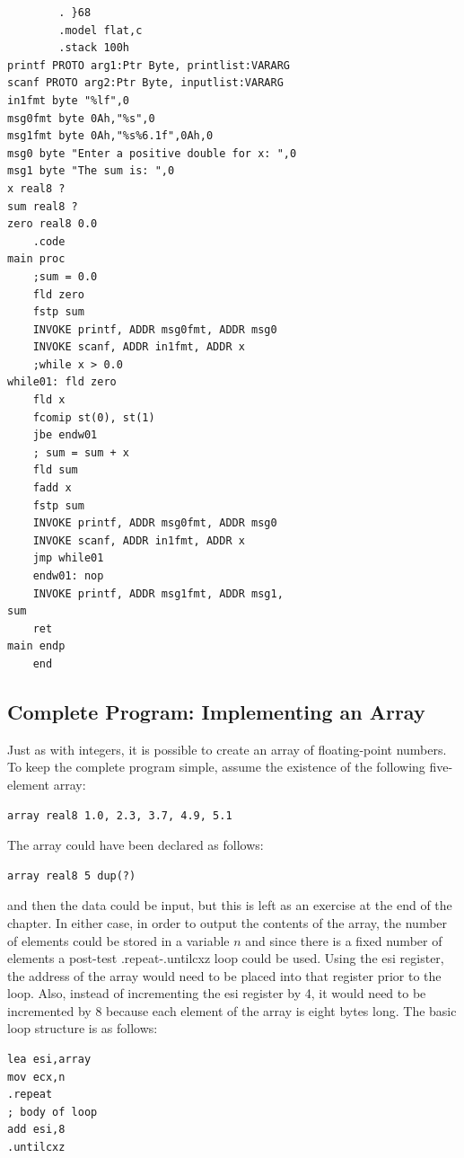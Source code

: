 \documentclass[10pt]{book}
\begin{document}
\begin{verbatim}
        . }68
        .model flat,c
        .stack 100h
printf PROTO arg1:Ptr Byte, printlist:VARARG
scanf PROTO arg2:Ptr Byte, inputlist:VARARG
in1fmt byte "%lf",0
msg0fmt byte 0Ah,"%s",0
msg1fmt byte 0Ah,"%s%6.1f",0Ah,0
msg0 byte "Enter a positive double for x: ",0
msg1 byte "The sum is: ",0
x real8 ?
sum real8 ?
zero real8 0.0
    .code
main proc
    ;sum = 0.0
    fld zero
    fstp sum
    INVOKE printf, ADDR msg0fmt, ADDR msg0
    INVOKE scanf, ADDR in1fmt, ADDR x
    ;while x > 0.0
while01: fld zero
    fld x
    fcomip st(0), st(1)
    jbe endw01
    ; sum = sum + x
    fld sum
    fadd x
    fstp sum
    INVOKE printf, ADDR msg0fmt, ADDR msg0
    INVOKE scanf, ADDR in1fmt, ADDR x
    jmp while01
    endw01: nop
    INVOKE printf, ADDR msg1fmt, ADDR msg1,
sum
    ret
main endp
    end
\end{verbatim}

\subsection{Complete Program: Implementing an Array}
Just as with integers, it is possible to create an array of floating-point numbers. To keep the complete program simple, assume the existence of the following five-element array:
\begin{verbatim}
array real8 1.0, 2.3, 3.7, 4.9, 5.1
\end{verbatim}

The array could have been declared as follows:

\begin{verbatim}
array real8 5 dup(?)
\end{verbatim}

and then the data could be input, but this is left as an exercise at the end of the chapter. In either case, in order to output the contents of the array, the number of elements could be stored in a variable $n$ and since there is a fixed number of elements a post-test .repeat-.untilcxz loop could be used. Using the esi register, the address of the array would need to be placed into that register prior to the loop. Also, instead of incrementing the esi register by 4, it would need to be incremented by 8 because each element of the array is eight bytes long. The basic loop structure is as follows:

\begin{verbatim}
lea esi,array
mov ecx,n
.repeat
; body of loop
add esi,8
.untilcxz
\end{verbatim}
\end{document}
